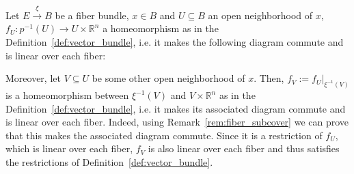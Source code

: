 \begin{remark}\label{rem:vector_subcover} Let $E\overset{\xi}{\to} B$ be a fiber bundle, $x\in B$ and $U\subseteq B$ an open neighborhood of $x$, $f_U:p^{-1}(U)\to U\times\mathbb{R}^n$ a homeomorphism as in the Definition~\ref{def:vector_bundle}, i.e. it makes the following diagram commute and is linear over each fiber:
\begin{center}
\end{center}
Moreover, let $V\subseteq U$ be some other open neighborhood of $x$. Then, $f_V:=f_U|_{\xi^{-1}(V)}$ is a homeomorphism between $\xi^{-1}(V)$ and $V\times\mathbb{R}^n$ as in the Definition~\ref{def:vector_bundle}, i.e. it makes its associated diagram commute and is linear over each fiber. Indeed, using Remark~\ref{rem:fiber_subcover} we can prove that this makes the associated diagram commute. Since it is a restriction of $f_U$, which is linear over each fiber, $f_V$ is also linear over each fiber and thus satisfies the restrictions of Definition~\ref{def:vector_bundle}.
\end{remark}

